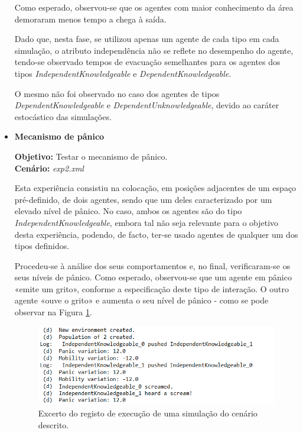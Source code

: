 \documentclass[12pt]{article}
\begin{document}
\begin{titlepage}
\begin{itemize}
	Como esperado, observou-se que os agentes com maior conhecimento da área demoraram menos tempo a chega à saída.
	
	Dado que, nesta fase, se utilizou apenas um agente de cada tipo em cada simulação, o atributo independência não se reflete no desempenho do agente, tendo-se observado tempos de evacuação semelhantes para os agentes dos tipos \textit{IndependentKnowledgeable} e \textit{DependentKnowledgeable}. 
	
	O mesmo não foi observado no caso dos agentes de tipos \textit{DependentKnowledgeable} e \textit{DependentUnknowledgeable}, devido ao caráter estocástico das simulações.

	
	\item \textbf{Mecanismo de pânico}
	
	\textbf{Objetivo:} 
	Testar o mecanismo de pânico.
	\\\textbf{Cenário:} 
	\textit{exp2.xml}	
	
	Esta experiência consistiu na colocação, em posições adjacentes de um espaço pré-definido, de dois agentes, sendo que um deles caracterizado por um elevado nível de pânico. No caso, ambos os agentes são do tipo \textit{IndependentKnowledgeable}, embora tal não seja relevante para o objetivo desta experiência, podendo, de facto, ter-se usado agentes de qualquer um dos tipos definidos.
	
	Procedeu-se à análise dos seus comportamentos e, no final, verificaram-se os seus níveis de pânico. 
		Como esperado, observou-se que um agente em pânico «emite um grito», conforme a especificação deste tipo de interação. O outro agente «ouve o grito» e aumenta o seu nível de pânico - como se pode observar na Figura \ref{panic_log}.
	
	\begin{figure}[H]
		\centering
		\includegraphics{panic_log.png}
		\caption{Excerto do registo de execução de uma simulação do cenário descrito.}
		\label{panic_log}
	\end{figure}


\end{itemize}
\end{titlepage}
\end{document}
